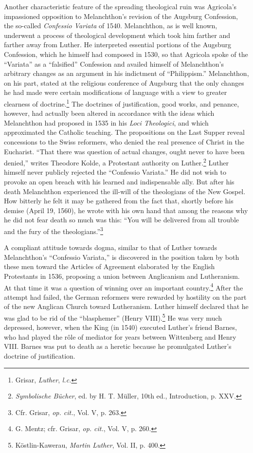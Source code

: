 Another characteristic feature of the spreading theological ruin
was Agricola’s impassioned opposition to Melanchthon’s revision of
the Augsburg Confession, the so-called \textit{Confessio Variata} of 1540.
Melanchthon, as is well known, underwent a process of theological
development which took him farther and farther away from Luther.
He interpreted essential portions of the Augsburg Confession, which
he himself had composed in 1530, so that Agricola spoke of the “Variata”
as a “falsified” Confession and availed himself of Melanchthon’s
arbitrary changes as an argument in his indictment of “Philippism.”
Melanchthon, on his part, stated at the religious conference of Augsburg
that the only changes he had made were certain modifications
of language with a view to greater clearness of doctrine.\footnote{Grisar, \textit{Luther}, \textit{l.c.}}
 The doctrines
of justification, good works, and penance, however, had actually been
altered in accordance with the ideas which Melanchthon
had proposed in 1535 in his \textit{Loci Theologici}, and which approximated
the Catholic teaching. The propositions on the Last Supper reveal
concessions to the Swiss reformers, who denied the real presence of
Christ in the Eucharist. “That there was question of actual changes,
ought never to have been denied,” writes Theodore Kolde, a Protestant
authority on Luther.\footnote{\textit{Symbolische Bücher}, ed. by H. T. Müller, 10th ed., Introduction, p. XXV.}
Luther himself never publicly rejected
the “Confessio Variata.” He did not wish to provoke an open breach
with his learned and indispensable ally. But after his death Melanchthon
experienced the ill-will of the theologians of the New Gospel.
How bitterly he felt it may be gathered from the fact that, shortly
before his demise (April 19, 1560), he wrote with his own hand that
among the reasons why he did not fear death so much was this: “You
will be delivered from all trouble and the fury of the theologians.”\footnote{Cfr. Grisar, \textit{op. cit.}, Vol. V, p. 263.}

A compliant attitude towards dogma, similar to that of Luther
towards Melanchthon’s “Confessio Variata,” is discovered in the position
taken by both these men toward the Articles of Agreement
elaborated by the English Protestants in 1536, proposing a union between
Anglicanism and Lutheranism. At that time it was a question
of winning over an important country.\footnote{G. Mentz; cfr. Grisar, \textit{op. cit.}, Vol. V, p. 260.}
 After the attempt had
failed, the German reformers were rewarded by hostility on the part
of the new Anglican Church toward Lutheranism. Luther himself
declared that he was glad to be rid of the “blasphemer” (Henry
VIII).\footnote{Köstlin-Kawerau, \textit{Martin Luther}, Vol. II, p. 400.}
 He was very much depressed, however, when the King (in
1540) executed Luther’s friend Barnes, who had played the rôle of
mediator for years between Wittenberg and Henry VIII. Barnes was
put to death as a heretic because he promulgated Luther’s doctrine
of justification.

